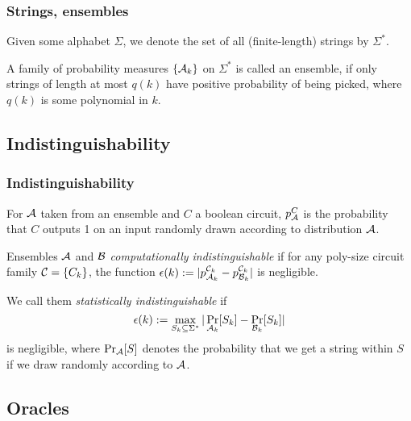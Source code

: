 \documentclass{beamer}
\begin{document}
\begin{frame}
  \frametitle{Strings, ensembles}
  \begin{definition}
    Given some alphabet $\Sigma$, we denote the set of all
    (finite-length) strings by $\Sigma^*$.
  \end{definition}
  \begin{definition}[Ensemble]
    A family of probability measures $\left\{ {\cal A}_k\right\} $ on $\Sigma^*$ is called an ensemble, if only strings of length at most $q(k)$ have positive probability of being picked, where $q(k)$ is some polynomial in $k$.
  \end{definition}
\end{frame}

\subsection{Indistinguishability}

\begin{frame}
  \frametitle{Indistinguishability}
  \begin{definition}[Indistinguishability]
    For ${\cal A}$ taken from an ensemble and $C$ a boolean circuit, $p_{{\cal A}}^C$ is the probability that $C$ outputs 1 on an input randomly drawn according to distribution ${\cal A}$.

    Ensembles ${\cal A}$ and ${\cal B}$ \emph{computationally indistinguishable} if for any poly-size circuit family ${\cal C}=\left\{ C_k \right\}$, the function $\epsilon(k):=|p_{{\cal A}_k}^{{\cal C}_k}-p_{{\cal B}_k}^{{\cal C}_k}|$ is negligible.

    We call them \emph{statistically indistinguishable} if
    \begin{equation*}
      \epsilon(k):=\max_{S_k\subseteq \Sigma^*}|\Pr_{{\cal A}_k}[S_k]-\Pr_{{\cal B}_k}[S_k]|
    \end{equation*} is negligible, where $\Pr_{{\cal A}}[S]$ denotes the probability that we get a string within $S$ if we draw randomly according to ${\cal A}$.

  \end{definition}

\end{frame}

\subsection{Oracles}
\end{document}
